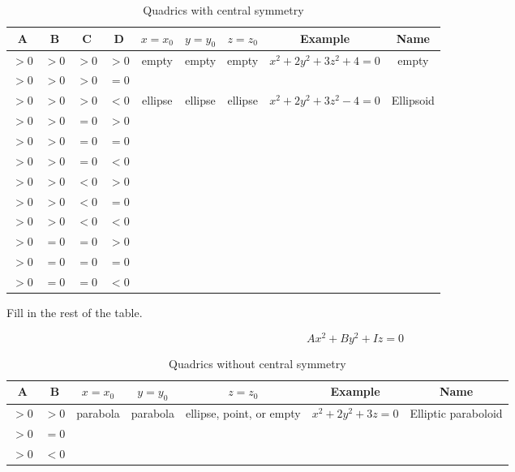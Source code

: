 \begin{table}
\begin{tabular}{|c|c|c|c|c|c|c|c|c|}
  \hline
  A & B & C & D & $x=x_0$ & $y=y_0$ & $z=z_0$ & Example & Name
  \\
  \hline
  $>0$ & $>0$ & $>0$ & $>0$ & empty & empty & empty & $x^2+2y^2+3z^2+4=0$ & empty \\
  \hline
  $>0$ & $>0$ & $>0$ & $=0$ &  &  &  &  &  \\
  \hline
  $>0$ & $>0$ & $>0$ & $<0$ & ellipse & ellipse & ellipse & $x^2+2y^2+3z^2-4=0$ & Ellipsoid \\
  \hline
  $>0$ & $>0$ & $=0$ & $>0$ &  &  &  &  &  \\
  \hline
  $>0$ & $>0$ & $=0$ & $=0$ &  &  &  &  &  \\
  \hline
  $>0$ & $>0$ & $=0$ & $<0$ &  &  &  &  &  \\
  \hline
  $>0$ & $>0$ & $<0$ & $>0$ &  &  &  &  &  \\
  \hline
  $>0$ & $>0$ & $<0$ & $=0$ &  &  &  &  &  \\
  \hline
  $>0$ & $>0$ & $<0$ & $<0$ &  &  &  &  &  \\
  \hline
  $>0$ & $=0$ & $=0$ & $>0$ &  &  &  &  &  \\
  \hline
  $>0$ & $=0$ & $=0$ & $=0$ &  &  &  &  &  \\
  \hline
  $>0$ & $=0$ & $=0$ & $<0$ &  &  &  &  &  \\
  \hline
\end{tabular}
\caption{Quadrics with central symmetry}
\end{table}

Fill in the rest of the table.

\bigskip


\begin{equation*}
Ax^2+By^2+Iz=0
\end{equation*}

\begin{table}
\begin{tabular}{|c|c|c|c|c|c|c|}
  \hline
  A & B  & $x=x_0$ & $y=y_0$ & $z=z_0$ & Example & Name
  \\
  \hline
  $>0$ & $>0$   & parabola & parabola & ellipse, point, or empty & $x^2+2y^2+3z=0$ & Elliptic paraboloid \\
  \hline
  $>0$ & $=0$ & &  &  &  &   \\
  \hline
  $>0$ & $<0$ &  &  &  &  &   \\
  \hline
\end{tabular}
  \caption{Quadrics without central symmetry}
\end{table}
\bigskip

